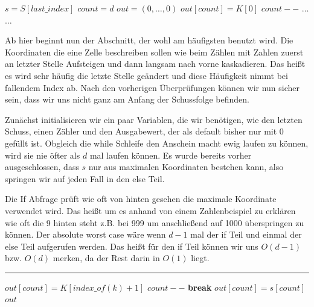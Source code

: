 \documentclass[a4paper,12pt]{llncs}
\numberwithin{equation}{section}
\begin{document}
\begin{tcolorbox}
	\begin{algorithmic}
		\State $s=S[last\_index]$
		\State $count =d$
		\State $out=(0,\dots,0)$
		\State $out[count]=K[0]$
		\State $count--$
		\Else
		\State $\dots$
		\EndIf
		\State $\dots$
		\EndWhile
	\end{algorithmic}
\end{tcolorbox}

Ab hier beginnt nun der Abschnitt, der wohl am häufigsten benutzt wird. Die Koordinaten die eine Zelle beschreiben sollen wie beim Zählen mit Zahlen zuerst an letzter Stelle Aufsteigen und dann langsam nach vorne kaskadieren. Das heißt es wird sehr häufig die letzte Stelle geändert und diese Häufigkeit nimmt bei fallendem Index ab. Nach den vorherigen Überprüfungen können wir nun sicher sein, dass wir uns nicht ganz am Anfang der Schussfolge befinden.

Zunächst initialisieren wir ein paar Variablen, die wir benötigen, wie den letzten Schuss, einen Zähler und den Ausgabewert, der als default bisher nur mit 0 gefüllt ist. Obgleich die while Schleife den Anschein macht ewig laufen zu können, wird sie nie öfter als $d$ mal laufen können. Es wurde bereits vorher ausgeschlossen, dass $s$ nur aus maximalen Koordinaten bestehen kann, also springen wir auf jeden Fall in den else Teil. 

Die If Abfrage prüft wie oft von hinten gesehen die maximale Koordinate verwendet wird. Das heißt um es anhand von einem Zahlenbeispiel zu erklären wie oft die 9 hinten steht z.B. bei 999 um anschließend auf 1000 überspringen zu können. Der absolute worst case wäre wenn $d-1$ mal der if Teil und einmal der else Teil aufgerufen werden. Das heißt für den if Teil können wir uns $O(d-1)$ bzw. $O(d)$ merken, da der Rest darin in $O(1)$ liegt.



\smallskip
\hrule
\smallskip

\begin{tcolorbox}
	\begin{algorithmic}
		\For{\textbf{each } $k\in K\backslash\{max\_coord\}$}
		\If{$s[count]=k$}
		\State $out[count]=K[index\_of(k)+1]$
		\State $count--$
		\State \textbf{break}
		\EndIf
		\EndFor
		\For{int $j=count$ \textbf{ to } 1}
		\State $out[count]=s[count]$
		\EndFor
		\State\Return $out$
	\end{algorithmic}
\end{tcolorbox}
\end{document}
